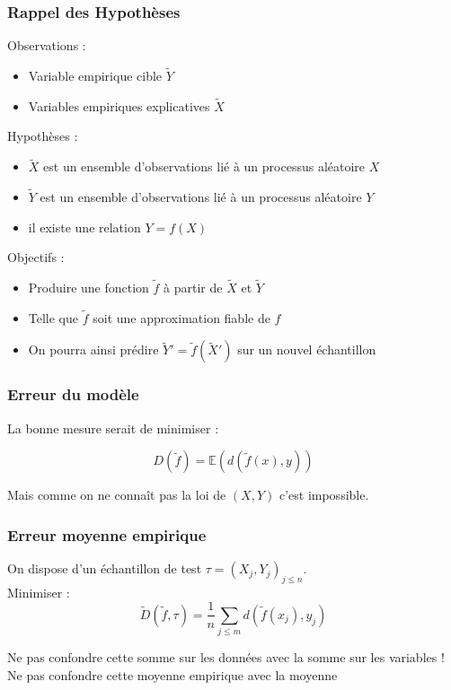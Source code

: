 \documentclass[11pt]{beamer}
\newenvironment{slide}[1]{%
\begin{frame}[environment=slide]
\frametitle{#1}
}{%
\end{frame}
}
\begin{document}
\begin{slide}{Rappel des Hypothèses}
Observations :\\

\begin{itemize}

\item Variable empirique cible $\tilde{Y}$
\item Variables empiriques explicatives $\tilde{X}$

\end{itemize}

\pause

Hypothèses :\\

\begin{itemize}

\item $\tilde{X}$ est un ensemble d'observations lié à un processus aléatoire $X$
\item $\tilde{Y}$ est un ensemble d'observations lié à un processus aléatoire $Y$
\item il existe une relation $Y = f(X)$

\end{itemize}

\pause

Objectifs :\\

\begin{itemize}
\item Produire une fonction $\tilde{f}$ à partir de $\tilde{X}$ et $\tilde{Y}$
\item Telle que $\tilde{f}$ soit une approximation fiable de $f$
\item On pourra ainsi prédire $\tilde{Y}' = \tilde{f}(\tilde{X}')$ sur un nouvel échantillon 
\end{itemize}

\end{slide}


\begin{slide}{Erreur du modèle}

La bonne mesure serait de minimiser :

$$D(\tilde{f}) = \mathbb{E}(d(\tilde{f}(x),y))$$

\pause

Mais comme on ne connaît pas la loi de $(X,Y)$ c'est impossible.

\end{slide}


\begin{slide}{Erreur moyenne empirique}

On dispose d'un échantillon de test $\tau = (X_j,Y_j)_{j\leq n}$.\\

Minimiser :
$$\tilde{D}(\tilde{f},\tau) = \frac{1}{n}\sum_{j \leq m} d(\tilde{f}(x_j),y_j)$$

\pause

Ne pas confondre cette somme sur les données avec la somme sur les variables !\\
Ne pas confondre cette moyenne empirique avec la moyenne 
\end{slide}
\end{document}
